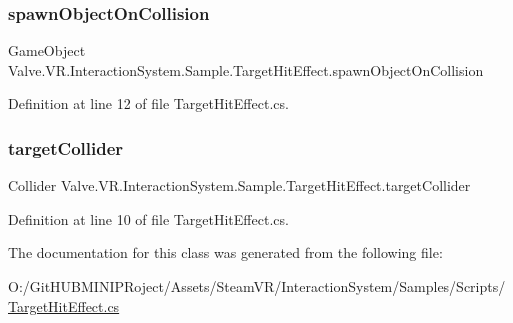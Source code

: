 \subsubsection{\texorpdfstring{spawnObjectOnCollision}{spawnObjectOnCollision}}
{\footnotesize\ttfamily Game\+Object Valve.\+V\+R.\+Interaction\+System.\+Sample.\+Target\+Hit\+Effect.\+spawn\+Object\+On\+Collision}



Definition at line 12 of file Target\+Hit\+Effect.\+cs.

\mbox{\label{class_valve_1_1_v_r_1_1_interaction_system_1_1_sample_1_1_target_hit_effect_aafe4a35a98ead9da4f8803254c6424db}} 
\subsubsection{\texorpdfstring{targetCollider}{targetCollider}}
{\footnotesize\ttfamily Collider Valve.\+V\+R.\+Interaction\+System.\+Sample.\+Target\+Hit\+Effect.\+target\+Collider}



Definition at line 10 of file Target\+Hit\+Effect.\+cs.



The documentation for this class was generated from the following file\+:\begin{DoxyCompactItemize}
\item 
O\+:/\+Git\+H\+U\+B\+M\+I\+N\+I\+P\+Roject/\+Assets/\+Steam\+V\+R/\+Interaction\+System/\+Samples/\+Scripts/\mbox{\hyperlink{_target_hit_effect_8cs}{Target\+Hit\+Effect.\+cs}}\end{DoxyCompactItemize}
